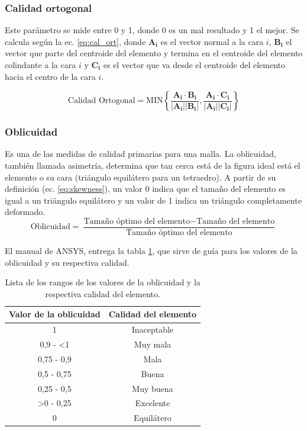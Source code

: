 \subsubsection{Calidad ortogonal}
Este parámetro se mide entre 0 y 1, donde 0 es un mal resultado y 1 el mejor. Se calcula según la ec. \ref{eq:cal_ort}, donde $\mathbf{A_i}$ es el vector normal a la cara $i$, $\mathbf{B_i}$ el vector que parte del centroide del elemento y termina en el centroide del elemento colindante a la cara $i$ y $\mathbf{C_i}$ es el vector que va desde el centroide del elemento hacia el centro de la cara $i$.

\begin{equation} \label{eq:cal_ort}
	\text{Calidad Ortogonal} = \text{MIN}\left\lbrace \frac{\mathbf{A_i}\cdot \mathbf{B_i}}{|\mathbf{A_i}||\mathbf{B_i}|} , \frac{\mathbf{A_i}\cdot \mathbf{C_i}}{|\mathbf{A_i}||\mathbf{C_i}|} \right\rbrace
\end{equation}

\subsubsection{Oblicuidad}
Es una de las medidas de calidad primarias para una malla. La oblicuidad, también llamada asimetría, determina que tan cerca está de la figura ideal está el elemento o su cara (triángulo equilátero para un tetraedro). A partir de su definición (ec. \ref{eq:skewness}), un valor 0 indica que el tamaño del elemento es igual a un triángulo equilátero y un valor de 1 indica un triángulo completamente deformado. 
\begin{equation} \label{eq:skewness}
	\text{Oblicuidad} = \frac{\text{Tamaño óptimo del elemento} - \text{Tamaño del elemento}}{\text{Tamaño óptimo del elemento}}
\end{equation}

El manual de ANSYS, entrega la tabla \ref{tab:skewness}, que sirve de guía para los valores de la oblicuidad y su respectiva calidad.

\begin{table}[]
\centering
\begin{tabular}{@{}cc@{}}
\toprule
Valor de la oblicuidad & Calidad del elemento \\ \midrule
1 & Inaceptable \\
0,9 - <1 & Muy mala \\
0,75 - 0,9 & Mala \\
0,5 - 0,75 & Buena \\
0,25 - 0,5 & Muy buena \\
>0 - 0,25 & Excelente \\
0 & Equilátero \\ \bottomrule
\end{tabular}
\caption{Lista de los rangos de los valores de la oblicuidad y la respectiva calidad del elemento. \cite{sharcnet_2017}}
\label{tab:skewness}
\end{table}

